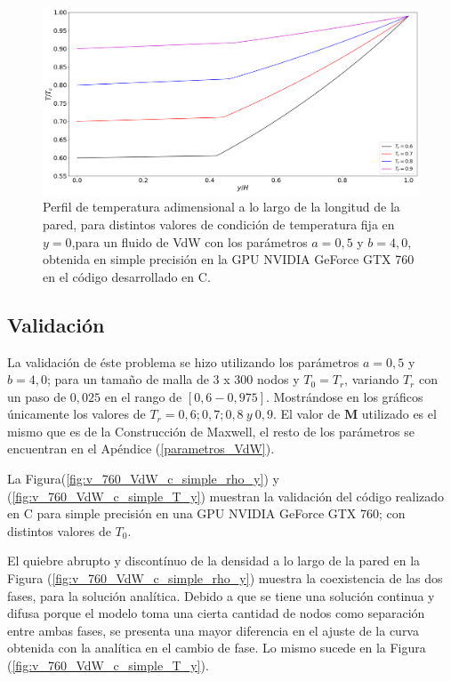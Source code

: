 \begin{figure}[htbp]
	\centering
	\includegraphics[width=\textwidth]{figs/cap4/VdW_val_T_y}
	\caption{Perfil de temperatura adimensional a lo largo de la longitud de la pared, para distintos valores de condición de temperatura fija en $y = 0$,para un fluido de VdW con los parámetros $a = 0,5 $ y $b = 4,0 $, obtenida en simple precisión en la GPU NVIDIA GeForce GTX 760 en el código desarrollado en \textsc{C}.} 
	\label{fig:VdW_val_T_y}	
\end{figure}

\newpage

\subsection{Validación}

La validación de éste problema se hizo utilizando los parámetros $a =0,5$ y $b = 4,0$; para un tamaño de malla de 3 x 300 nodos y $T_0 = T_r$, variando $T_r$ con un paso de $0,025$ en el rango de $[0,6 - 0,975]$. Mostrándose en los gráficos únicamente los valores de $T_r = 0,6 ; 0,7 ; 0,8 \> y \> 0,9$.    El valor de $\mathbf{M}$ utilizado es el mismo que es de la Construcción de Maxwell, el resto de los parámetros se encuentran en el Apéndice (\ref{parametros_VdW}).

La Figura(\ref{fig:v_760_VdW_c_simple_rho_y}) y (\ref{fig:v_760_VdW_c_simple_T_y})  muestran la validación del código realizado en \textsc{C} para simple precisión en una GPU NVIDIA GeForce GTX 760; con distintos valores de $T_0$. 

El quiebre abrupto y discontínuo de la densidad a lo largo de la pared en la Figura (\ref{fig:v_760_VdW_c_simple_rho_y}) muestra la coexistencia de las dos fases, para la solución analítica. Debido a que se tiene una solución continua y difusa porque el modelo toma una cierta cantidad de nodos como separación entre ambas fases, se presenta una mayor diferencia en el ajuste de la curva obtenida con la analítica en el cambio de fase. Lo mismo sucede en la Figura (\ref{fig:v_760_VdW_c_simple_T_y}).

